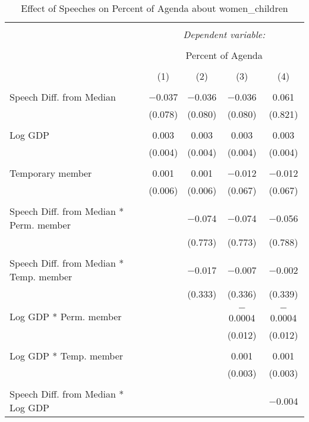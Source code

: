 
\begin{table}[!htbp] \centering 
  \caption{Effect of Speeches on Percent of Agenda about women_children} 
  \label{} 
\begin{tabular}{@{\extracolsep{5pt}}lcccc} 
\\[-1.8ex]\hline 
\hline \\[-1.8ex] 
 & \multicolumn{4}{c}{\textit{Dependent variable:}} \\ 
\cline{2-5} 
\\[-1.8ex] & \multicolumn{4}{c}{Percent of Agenda} \\ 
\\[-1.8ex] & (1) & (2) & (3) & (4)\\ 
\hline \\[-1.8ex] 
 Speech Diff. from Median & $-$0.037 & $-$0.036 & $-$0.036 & 0.061 \\ 
  & (0.078) & (0.080) & (0.080) & (0.821) \\ 
  & & & & \\ 
 Log GDP & 0.003 & 0.003 & 0.003 & 0.003 \\ 
  & (0.004) & (0.004) & (0.004) & (0.004) \\ 
  & & & & \\ 
 Temporary member & 0.001 & 0.001 & $-$0.012 & $-$0.012 \\ 
  & (0.006) & (0.006) & (0.067) & (0.067) \\ 
  & & & & \\ 
 Speech Diff. from Median * Perm. member &  & $-$0.074 & $-$0.074 & $-$0.056 \\ 
  &  & (0.773) & (0.773) & (0.788) \\ 
  & & & & \\ 
 Speech Diff. from Median * Temp. member &  & $-$0.017 & $-$0.007 & $-$0.002 \\ 
  &  & (0.333) & (0.336) & (0.339) \\ 
  & & & & \\ 
 Log GDP * Perm. member &  &  & $-$0.0004 & $-$0.0004 \\ 
  &  &  & (0.012) & (0.012) \\ 
  & & & & \\ 
 Log GDP * Temp. member &  &  & 0.001 & 0.001 \\ 
  &  &  & (0.003) & (0.003) \\ 
  & & & & \\ 
 Speech Diff. from Median * Log GDP &  &  &  & $-$0.004 \\ 

\end{tabular}
\end{table}
